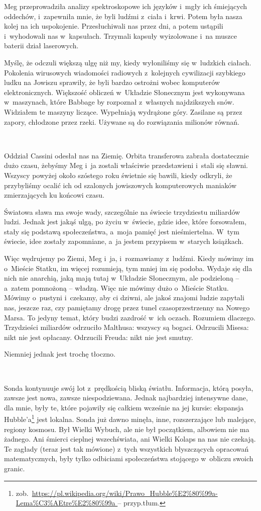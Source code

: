 \documentclass[oneside,polish,11pt,sfheadings]{mwbk}
\begin{document}
Meg przeprowadziła analizy spektroskopowe ich języków i~mgły ich
śmiejących oddechów, i~zapewniła mnie, że byli ludźmi z~ciała i~krwi.
Potem była nasza kolej na ich uspokojenie. Przesłuchiwali nas przez dni,
a potem ustąpili i~wyhodowali nas w~kapsułach. Trzymali kapsuły
wyizolowane i~na muszce baterii dział laserowych.

Myślę, że odczuli większą ulgę niż my, kiedy wyłoniliśmy się w~ludzkich
ciałach. Pokolenia wirusowych wiadomości radiowych z~kolejnych
cywilizacji szybkiego ludku na Jowiszu sprawiły, że byli bardzo ostrożni
wobec komputerów elektronicznych. Większość obliczeń w~Układzie
Słonecznym jest wykonywana w~maszynach, które Babbage by rozpoznał z~własnych najdzikszych snów. Widziałem te maszyny liczące. Wypełniają wydrążone góry.
Zasilane są przez zapory, chłodzone przez rzeki. Używane są do
rozwiązania milionów równań.

~

Oddział Cassini odesłał nas na Ziemię. Orbita transferowa zabrała dostatecznie dużo czasu, żebyśmy Meg i~ja zostali
właściwie przedstawieni i~stali się sławni. Wszyscy powyżej około
szóstego roku świetnie się bawili, kiedy odkryli, że przybyliśmy ocalić
ich od szalonych jowiszowych komputerowych maniaków zmierzających ku
końcowi czasu.

Światowa sława ma swoje wady, szczególnie na świecie trzydziestu
miliardów ludzi. Jednak jest jakąś ulgą, po życiu w~świecie, gdzie idee,
które forsowałem, stały się podstawą społeczeństwa, a~moja pamięć jest
nieśmiertelna. W~tym świecie, idee zostały zapomniane, a~ja jestem
przypisem w~starych książkach.

Więc wędrujemy po Ziemi, Meg i~ja, i~rozmawiamy z~ludźmi. Kiedy mówimy
im o~Mieście Statku, im więcej rozumieją, tym mniej im się podoba.
Wydaje się dla nich nie anarchią, jaką mają tutaj w~Układzie Słonecznym,
ale podzieloną -- a~zatem pomnożoną -- władzą. Więc nie mówimy dużo o~Mieście Statku. Mówimy o~pustyni i~czekamy, aby ci dziwni, ale jakoś
znajomi ludzie zapytali nas, jeszcze raz, czy pamiętamy drogę przez
tunel czasoprzestrzenny na Nowego Marsa. To jedyny temat, który budzi
zazdrość w~ich oczach. Rozumiem dlaczego. Trzydzieści miliardów
odrzuciło Malthusa: wszyscy są bogaci. Odrzucili Misesa: nikt nie jest
opłacany. Odrzucili Freuda: nikt nie jest smutny.

Niemniej jednak jest trochę tłoczno.

~

Sonda kontynuuje swój lot z~prędkością bliską światłu. Informacja, którą
posyła, zawsze jest nowa, zawsze niespodziewana. Jednak najbardziej
intensywne dane, dla mnie, były te, które pojawiły się całkiem wcześnie
na jej kursie: ekspansja Hubble'a\footnote{ zob.~\url{https://pl.wikipedia.org/wiki/Prawo_Hubble\%E2\%80\%99a-Lema\%C3\%AEtre\%E2\%80\%99a
} -- przyp.tłum.} jest lokalna. Sonda już dawno minęła, inne,
rozszerzające lub malejące, regiony kosmosu. Był Wielki Wybuch, ale nie
był początkiem, albowiem nie ma żadnego. Ani śmierci cieplnej
wszechświata, ani Wielki Kolaps na nas nie czekają. Te zagłady (teraz
jest tak mówione) z~tych wszystkich błyszczących opracowań
matematycznych, były tylko odbiciami społeczeństwa stojącego w~obliczu
swoich granic.
\end{document}
